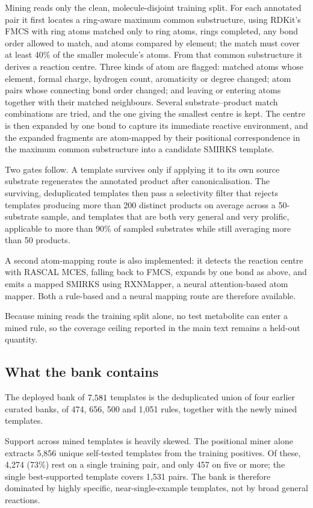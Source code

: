 Mining reads only the clean, molecule-disjoint training split. For each annotated pair it first
locates a ring-aware maximum common substructure, using RDKit's FMCS with ring atoms
matched only to ring atoms, rings completed, any bond order allowed to match, and atoms compared
by element; the match must cover at least 40\% of the smaller molecule's atoms. From that common
substructure it derives a reaction centre. Three kinds of atom are flagged: matched atoms whose element,
formal charge, hydrogen count, aromaticity or degree changed; atom pairs whose connecting bond
order changed; and leaving or entering atoms together with their matched neighbours. Several
substrate--product match combinations are tried, and the one giving the smallest centre is kept.
The centre is then
expanded by one bond to capture its immediate reactive environment, and the expanded fragments are
atom-mapped by their positional correspondence in the maximum common substructure into a candidate
SMIRKS template.

Two gates follow. A template survives only if applying it to its own source substrate regenerates
the annotated product after canonicalisation. The surviving, deduplicated templates then pass a
selectivity filter that rejects templates producing more than 200 distinct products on average
across a 50-substrate sample, and templates that are both very general and very prolific,
applicable to more than 90\% of sampled substrates while still averaging more than 50
products.

A second atom-mapping route is also implemented: it detects the reaction centre with RASCAL MCES,
falling back to FMCS, expands by one bond as above, and emits a mapped SMIRKS using RXNMapper, a
neural attention-based atom mapper. Both a rule-based and a neural mapping route are therefore
available.

Because mining reads the training split alone, no test metabolite can enter a mined rule, so the
coverage ceiling reported in the main text remains a held-out quantity.

\subsection{What the bank contains}

The deployed bank of $7{,}581$ templates is the deduplicated union of four earlier curated banks,
of 474, 656, 500 and 1{,}051 rules, together with the newly mined templates.

Support across mined templates is heavily skewed. The positional miner alone extracts 5{,}856
unique self-tested templates from the training positives. Of these, 4{,}274 (73\%)
rest on a single training pair, and only 457 on five or more; the single best-supported template
covers 1{,}531 pairs. The bank is therefore dominated by highly specific, near-single-example
templates, not by broad general reactions.

